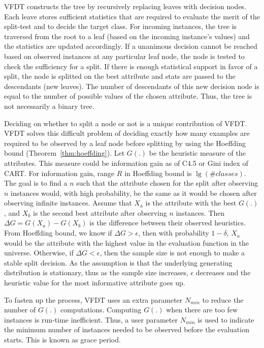 VFDT constructs the tree by recursively replacing leaves with decision nodes. Each leave stores sufficient statistics that are required to evaluate the merit of the split-test and to decide the target class. For incoming instances, the tree is traversed from the root to a leaf (based on the incoming instance's values) and the statistics are updated accordingly. If a unanimous decision cannot be reached based on observed instances at any particular leaf node, the node is tested to check the sufficiency for a split. If there is enough statistical support in favor of a split, the node is splitted on the best attribute and stats are passed to the descendants (new leaves). The number of descendants of this new decision node is equal to the number of possible values of the chosen attribute. Thus, the tree is not necessarily a binary tree.

Deciding on whether to split a node or not is a unique contribution of VFDT. VFDT solves this difficult problem of deciding exactly how many examples are required to be observed by a leaf node before splitting by using the Hoeffding bound (Theorem~\ref{thm:hoeffding}). Let $G(.)$ be the heuristic measure of the attributes. This measure could be information gain as of C4.5 or Gini index of CART. For information gain, range $R$ in Hoeffding bound is $\lg (\#classes)$. The goal is to find a $n$ such that the attribute chosen for the split after observing $n$ instances would, with high probability, be the same as it would be chosen after observing infinite instances. Assume that $X_a$ is the attribute with the best $G(.)$, and $X_b$ is the second best attribute after observing $n$ instances. Then $\Delta G = G(X_a) - G(X_b)$ is the difference between their observed heuristics. From Hoeffding bound, we know if $\Delta G > \epsilon$, then with probability $1 - \delta$, $X_a$ would be the attribute with the highest value in the evaluation function in the universe. Otherwise, if $\Delta G < \epsilon$, then the sample size is not enough to make a stable split decision. As the assumption is that the underlying generating distribution is stationary, thus as the sample size increases, $\epsilon$ decreases and the heuristic value for the most informative attribute goes up.

To fasten up the process, VFDT uses an extra parameter $N_{min}$ to reduce the number of $G(.)$ computations. Computing $G(.)$ when there are too few instances is run-time inefficient. Thus, a user parameter $N_{min}$ is used to indicate the minimum number of instances needed to be observed before the evaluation starts. This is known as grace period.


